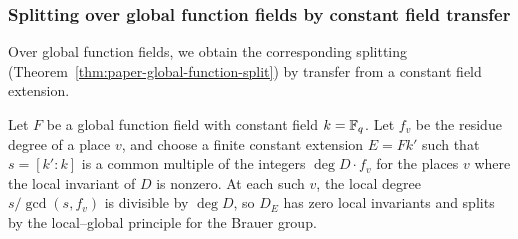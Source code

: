 \subsubsection{Splitting over global function fields by constant field transfer}
Over global function fields, we obtain the corresponding splitting (Theorem~\ref{thm:paper-global-function-split}) by transfer from a constant field extension.

Let $F$ be a global function field with constant field $k=\mathbb F_q$.
Let $f_v$ be the residue degree of a place $v$, and choose a finite constant extension $E=Fk'$ such that $s=[k':k]$ is a common multiple of the integers $\deg D\cdot f_v$ for the places $v$ where the local invariant of $D$ is nonzero.
At each such $v$, the local degree $s/\gcd(s,f_v)$ is divisible by $\deg D$, so $D_E$ has zero local invariants and splits by the local--global principle for the Brauer group.

